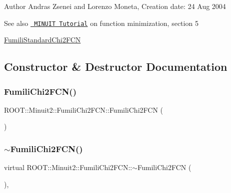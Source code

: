 \begin{DoxyAuthor}{Author}
Andras Zsenei and Lorenzo Moneta, Creation date\+: 24 Aug 2004
\end{DoxyAuthor}
\begin{DoxySeeAlso}{See also}
\href{http://www.cern.ch/winkler/minuit/tutorial/mntutorial.pdf}{\texttt{ M\+I\+N\+U\+IT Tutorial}} on function minimization, section 5

\mbox{\hyperlink{classROOT_1_1Minuit2_1_1FumiliStandardChi2FCN}{Fumili\+Standard\+Chi2\+F\+CN}} 
\end{DoxySeeAlso}


\subsection{Constructor \& Destructor Documentation}
\mbox{\label{classROOT_1_1Minuit2_1_1FumiliChi2FCN_ae0918088996b787c67bdbe0b79b134cb}} 
\subsubsection{\texorpdfstring{FumiliChi2FCN()}{FumiliChi2FCN()}\hspace{0.1cm}{\footnotesize\ttfamily [1/2]}}
{\footnotesize\ttfamily R\+O\+O\+T\+::\+Minuit2\+::\+Fumili\+Chi2\+F\+C\+N\+::\+Fumili\+Chi2\+F\+CN (\begin{DoxyParamCaption}{ }\end{DoxyParamCaption})\hspace{0.3cm}{\ttfamily [inline]}}

\mbox{\label{classROOT_1_1Minuit2_1_1FumiliChi2FCN_a50ee230fc1f0a93c6b9491a031f19b94}} 
\subsubsection{\texorpdfstring{$\sim$FumiliChi2FCN()}{~FumiliChi2FCN()}\hspace{0.1cm}{\footnotesize\ttfamily [1/2]}}
{\footnotesize\ttfamily virtual R\+O\+O\+T\+::\+Minuit2\+::\+Fumili\+Chi2\+F\+C\+N\+::$\sim$\+Fumili\+Chi2\+F\+CN (\begin{DoxyParamCaption}{ }\end{DoxyParamCaption})\hspace{0.3cm}{\ttfamily [inline]}, {\ttfamily [virtual]}}

